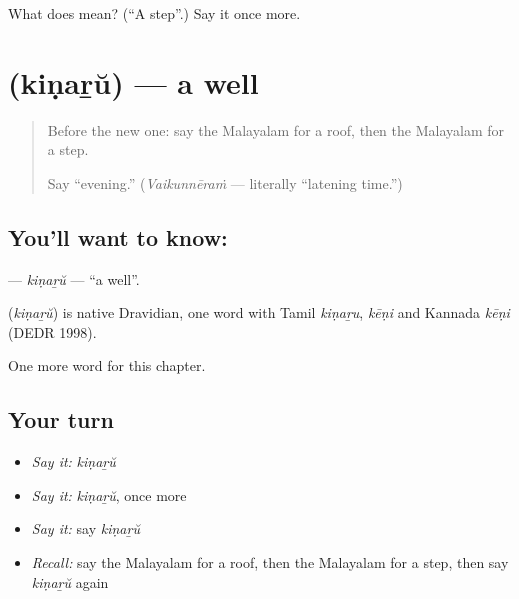 \begin{tcolorbox}[breakable,colback=teal!4,colframe=teal!35!black,title={Before you move on}]
What does  mean? (\textquotedblleft{}A step\textquotedblright{}.) Say it once more.
\end{tcolorbox}
\section[\texorpdfstring{\ml{കിണറ്} (kiṇaṟŭ)}{കിണറ് (kiṇaṟŭ)}]{ (kiṇaṟŭ) — a well}

\label{lesson:ML-C148-kinaru}



\begin{quote}
Before the new one: say the Malayalam for a roof, then the Malayalam for a step.

Say \textquotedblleft{}evening.\textquotedblright{} (\emph{Vaikunnēraṁ} — literally \textquotedblleft{}latening time.\textquotedblright{})
\end{quote}

\subsection*{You'll want to know: }
\textbf{} — \emph{kiṇaṟŭ} — \textquotedblleft{}a well\textquotedblright{}.

\begin{cousinweb}
\textbf{} (\emph{kiṇaṟŭ}) is native Dravidian, one word with Tamil \emph{kiṇaṟu}, \emph{kēṇi} and Kannada \emph{kēṇi} (DEDR 1998).
\end{cousinweb}

\begin{grammarlens}[title={What you've built}]
One more word for this chapter.
\end{grammarlens}

\subsection*{Your turn}
\begin{itemize}
\raggedright
  \item \emph{Say it:} \emph{kiṇaṟŭ}
  \item \emph{Say it:} \emph{kiṇaṟŭ}, once more
  \item \emph{Say it:} say \emph{kiṇaṟŭ}
  \item \emph{Recall:} say the Malayalam for a roof, then the Malayalam for a step, then say \emph{kiṇaṟŭ} again
\end{itemize}


